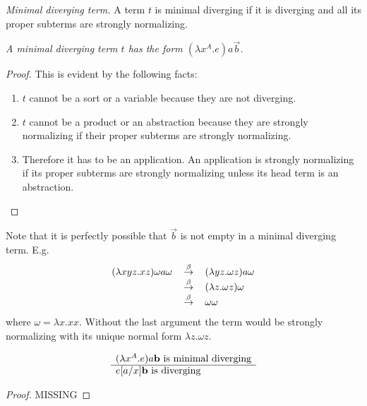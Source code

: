 \begin{definition}
    \emph{Minimal diverging term.} A term $t$ is minimal diverging if it is
    diverging and all its proper subterms are strongly normalizing.
\end{definition}




\begin{theorem}
    \label{thm:FormMinDiverging}
    \emph{A minimal diverging term $t$ has the form $(\lambda x^A.e) a \vec b$.}

    \begin{proof}
        This is evident by the following facts:
        \begin{enumerate}
        \item $t$ cannot be a sort or a variable because they are not diverging.

        \item $t$ cannot be a product or an abstraction because they are
            strongly normalizing if their proper subterms are strongly
            normalizing.

        \item Therefore it has to be an application. An application is strongly
            normalizing if its proper subterms are strongly normalizing unless
            its head term is an abstraction.
        \end{enumerate}
    \end{proof}
\end{theorem}

Note that it is perfectly possible that $\vec b$ is not empty in a minimal
diverging term. E.g.
$$
\begin{array}{lll}
    (\lambda x y z. x z) \omega a \omega
    &{\,\stackrel{\beta}{\to}\,}&
    (\lambda y z. \omega z) a \omega
    \\
    &{\,\stackrel{\beta}{\to}\,}&
    (\lambda z. \omega z) \omega
    \\
    &{\,\stackrel{\beta}{\to}\,}&
    \omega \omega
\end{array}
$$
where $\omega = \lambda x. x x$. Without the last argument the term would be
strongly normalizing with its unique normal form $\lambda z. \omega z$.






\begin{theorem}
    \label{thm:MinDivergingLeftMostDiverging}
    $$
    \begin{array}{l} 
        {(\lambda x^{A}. e) a} {\mathbf b} \text{ is minimal diverging}
     \\ \hline 
        e[a/x] {\mathbf b} \text{ is diverging}
    \end{array}
    $$
    \begin{proof}
        MISSING
    \end{proof}
\end{theorem}





